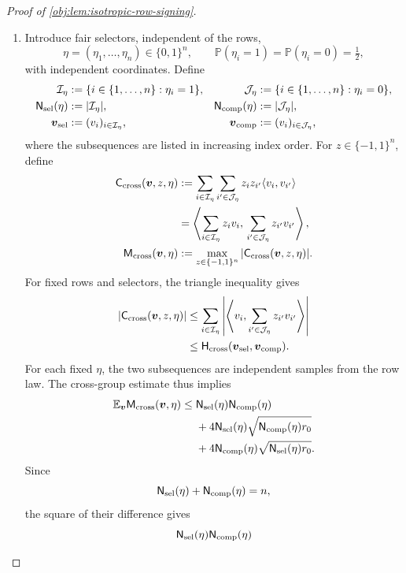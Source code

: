 \documentclass[11pt]{article}
\begin{document}
\begin{proof}[Proof of \cref{obj:lem:isotropic-row-signing}]
\begin{enumerate}
\item Introduce fair selectors, independent of the rows,
\[
\eta=(\eta_1,\ldots,\eta_n)\in\{0,1\}^n,
\qquad
\mathbb P(\eta_i=1)=\mathbb P(\eta_i=0)=\tfrac12,
\]
with independent coordinates. Define
\[
\begin{aligned}
\mathcal I_\eta&:=\{i\in\{1,\ldots,n\}:\eta_i=1\},&
\mathcal J_\eta&:=\{i\in\{1,\ldots,n\}:\eta_i=0\},\\
\mathsf N_{\rm sel}(\eta)&:=|\mathcal I_\eta|,&
\mathsf N_{\rm comp}(\eta)&:=|\mathcal J_\eta|,\\
\boldsymbol v_{\rm sel}&:=(v_i)_{i\in\mathcal I_\eta},&
\boldsymbol v_{\rm comp}&:=(v_i)_{i\in\mathcal J_\eta},
\end{aligned}
\]
where the subsequences are listed in increasing index order. For \(z\in\{-1,1\}^n\), define
\[
\begin{aligned}
\mathsf C_{\rm cross}(\boldsymbol v,z,\eta)
&:=\sum_{i\in\mathcal I_\eta}\sum_{i'\in\mathcal J_\eta}
z_i z_{i'}\langle v_i,v_{i'}\rangle\\
&=\left\langle
\sum_{i\in\mathcal I_\eta}z_i v_i,\,
\sum_{i'\in\mathcal J_\eta}z_{i'}v_{i'}
\right\rangle,\\
\mathsf M_{\rm cross}(\boldsymbol v,\eta)
&:=\max_{z\in\{-1,1\}^n}
|\mathsf C_{\rm cross}(\boldsymbol v,z,\eta)|.
\end{aligned}
\]
For fixed rows and selectors, the triangle inequality gives
\[
\begin{aligned}
|\mathsf C_{\rm cross}(\boldsymbol v,z,\eta)|
&\leq
\sum_{i\in\mathcal I_\eta}
\left|\left\langle
v_i,\sum_{i'\in\mathcal J_\eta}z_{i'}v_{i'}
\right\rangle\right|\\
&\leq\mathsf H_{\rm cross}(\boldsymbol v_{\rm sel},\boldsymbol v_{\rm comp}).
\end{aligned}
\]
For each fixed \(\eta\), the two subsequences are independent samples from the row law. The cross-group estimate thus implies
\[
\begin{aligned}
\mathbb E_{\boldsymbol v}\mathsf M_{\rm cross}(\boldsymbol v,\eta)
\leq{}&
\mathsf N_{\rm sel}(\eta)\mathsf N_{\rm comp}(\eta)\\
&+4\mathsf N_{\rm sel}(\eta)
\sqrt{\mathsf N_{\rm comp}(\eta)r_0}\\
&+4\mathsf N_{\rm comp}(\eta)
\sqrt{\mathsf N_{\rm sel}(\eta)r_0}.
\end{aligned}
\]
Since
\[
\mathsf N_{\rm sel}(\eta)+\mathsf N_{\rm comp}(\eta)=n,
\]
the square of their difference gives
\[
\mathsf N_{\rm sel}(\eta)\mathsf N_{\rm comp}(\eta)
\]
\end{enumerate}
\end{proof}
\end{document}

